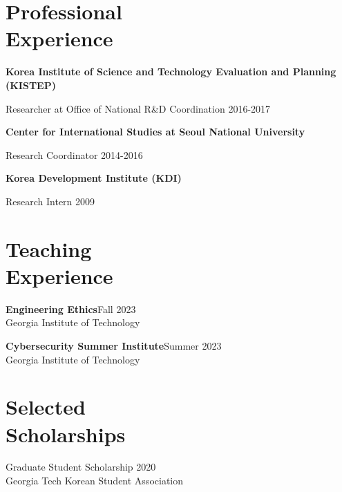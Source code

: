 \documentclass[margin,line, 10pt]{res}
\begin{document}
\begin{resume}
\section{\sc Professional\\ Experience}
\textbf{Korea Institute of Science and Technology Evaluation and Planning (KISTEP)}

\vspace{-0.4cm}
Researcher at Office of National R\&D Coordination \hfill {2016-2017 }

\textbf{Center for International Studies at Seoul National University}

\vspace{-0.4cm}
Research Coordinator \hfill {2014-2016}

{\bf Korea Development Institute (KDI)}

\vspace{-0.4cm}
Research Intern \hfill {2009}\\

\section{\sc Teaching\\ Experience}
{\bf Engineering Ethics}\hfill{Fall 2023}\\
Georgia Institute of Technology\\
\vspace{-0.4cm}

{\bf Cybersecurity Summer Institute}\hfill{Summer 2023}\\
Georgia Institute of Technology \\
\vspace{-0.4cm}



\section{\sc Selected\\Scholarships} 
Graduate Student Scholarship  \hfill 2020\\
Georgia Tech Korean Student Association  


\end{resume}
\end{document}
